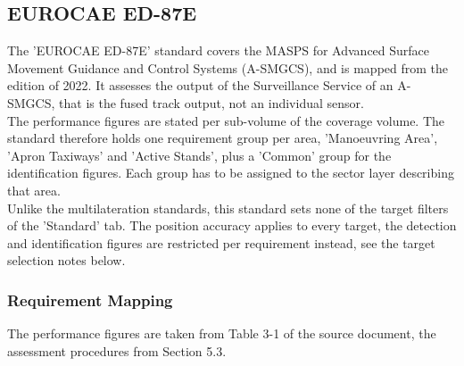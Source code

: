 \subsection{EUROCAE ED-87E}
\label{sec:appendix_eval_std_ed87e}

The 'EUROCAE ED-87E' standard covers the MASPS for Advanced Surface Movement Guidance and Control Systems (A-SMGCS), and is mapped from the edition of 2022. It assesses the output of the Surveillance Service of an A-SMGCS, that is the fused track output, not an individual sensor. \\

The performance figures are stated per sub-volume of the coverage volume. The standard therefore holds one requirement group per area, 'Manoeuvring Area', 'Apron Taxiways' and 'Active Stands', plus a 'Common' group for the identification figures. Each group has to be assigned to the sector layer describing that area. \\

Unlike the multilateration standards, this standard sets none of the target filters of the 'Standard' tab. The position accuracy applies to every target, the detection and identification figures are restricted per requirement instead, see the target selection notes below. \\

\subsubsection{Requirement Mapping}

The performance figures are taken from Table 3-1 of the source document, the assessment procedures from Section 5.3.

